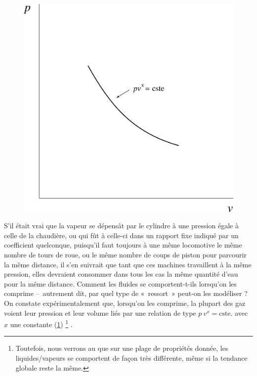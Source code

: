		\begin{figure}
			\begin{center}
			\includegraphics[width=\pvdiagramwidth]{images/pv_gaz_simple.png}
			\end{center}
			\label{fig_p-v_pvx}
		\end{figure}

			S’il était vrai que la vapeur se dépensât par le cylindre à une pression égale à celle de la chaudière, ou qui fût à celle-ci dans un rapport fixe indiqué par un coefficient quelconque, puisqu’il faut toujours à une même locomotive le même nombre de tours de roue, ou le même nombre de coups de piston pour parcourir la même distance, il s’en suivrait que tant que ces machines travaillent à la même pression, elles devraient consommer dans tous les cas la même quantité d’eau pour la même distance.
		Comment les fluides se comportent-t-ils lorsqu’on les comprime --\ autrement dit, par quel type de «~ressort~» peut-on les modéliser ? On constate expérimentalement que, lorsqu’on les comprime, la plupart des gaz voient leur pression et leur volume liés par une relation de type $p\ v^{x} = \text{cste.}$ avec $x$ une constante (\cref{fig_p-v_pvx})%
			\footnote{Toutefois, nous verrons au \courscinqshort que sur une plage de propriétés donnée, les liquides/vapeurs se comportent de façon très différente, même si la tendance globale reste la même.}%
		.

